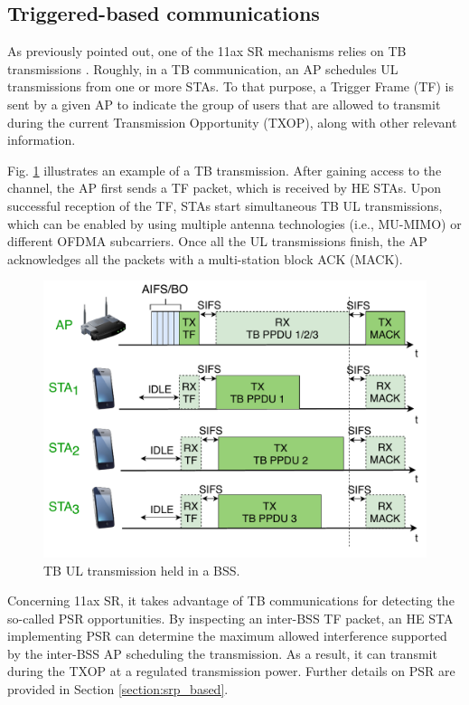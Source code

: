 \documentclass{ieeeaccess}
\begin{document}
\subsection{Triggered-based communications}
\label{section:tb_communication}
As previously pointed out, one of the 11ax SR mechanisms relies on TB transmissions \cite{bellalta2019ap}. Roughly, in a TB communication, an AP schedules UL transmissions from one or more STAs. To that purpose, a Trigger Frame (TF) is sent by a given AP to indicate the group of users that are allowed to transmit during the current Transmission Opportunity (TXOP), along with other relevant information. 

Fig. \ref{fig:TB_transmission_example} illustrates an example of a TB transmission. After gaining access to the channel, the AP first sends a TF packet, which is received by HE STAs. Upon successful reception of the TF, STAs start simultaneous TB UL transmissions, which can be enabled by using multiple antenna technologies (i.e., MU-MIMO) or different OFDMA subcarriers. Once all the UL transmissions finish, the AP acknowledges all the packets with a multi-station block ACK (MACK).

\begin{figure}[ht!]
	\centering
	\includegraphics[width=.95\columnwidth]{fig_8}
	\caption{TB UL transmission held in a BSS.}
	\label{fig:TB_transmission_example}
\end{figure}

Concerning 11ax SR, it takes advantage of TB communications for detecting the so-called PSR opportunities. By inspecting an inter-BSS TF packet, an HE STA implementing PSR can determine the maximum allowed interference supported by the inter-BSS AP scheduling the transmission. As a result, it can transmit during the TXOP at a regulated transmission power. Further details on PSR are provided in Section \ref{section:srp_based}.
\end{document}
